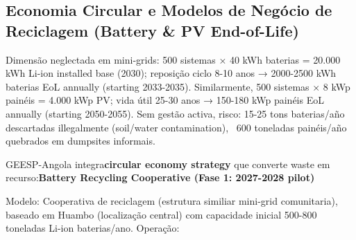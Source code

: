 \documentclass[12pt, a4paper]{article}
\begin{document}
\subsection{Economia Circular e Modelos de Negócio de Reciclagem (Battery \& PV End-of-Life)}

Dimensão neglectada em mini-grids: 500 sistemas × 40 kWh baterias = 20.000 kWh Li-ion installed base (2030); reposição ciclo 8-10 anos → 2000-2500 kWh baterias EoL annually (starting 2033-2035). Similarmente, 500 sistemas × 8 kWp painéis = 4.000 kWp PV; vida útil 25-30 anos → 150-180 kWp painéis EoL annually (starting 2050-2055). Sem gestão activa, risco: 15-25 tons baterias/año descartadas illegalmente (soil/water contamination), ~600 toneladas painéis/año quebrados em dumpsites informais.

GEESP-Angola integra\textbf{circular economy strategy} que converte waste em recurso:\textbf{Battery Recycling Cooperative (Fase 1: 2027-2028 pilot)}

Modelo: Cooperativa de reciclagem (estrutura similiar mini-grid comunitaria), baseado em Huambo (localização central) com capacidade inicial 500-800 toneladas Li-ion baterias/ano. Operação:
\end{document}
